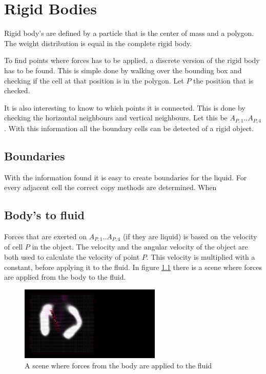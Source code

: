 \chapter{Rigid Bodies}
Rigid body's are defined by a particle that is the center of mass and a polygon. The weight distribution is equal in the complete rigid body.

To find points where forces has to be applied, a discrete version of the rigid body has to be found. This is simple done by walking over the bounding box and checking if the cell at that position is in the polygon. Let $P$ the position that is checked.

It is also interesting to know to which points it is connected. This is done by checking the horizontal neighbours and vertical neighbours. Let this be $A_{P,1} .. A_{P,4}$. With this information all the boundary cells can be detected of a rigid object.

\section{Boundaries}
With the information found it is easy to create boundaries for the liquid. For every adjacent cell the correct copy methods are determined. When

\section{Body's to fluid}
Forces that are exerted on $A_{P,1} .. A_{P,4}$ (if they are liquid) is based on the velocity of cell $P$ in the object. The velocity  and the angular velocity of the object are both used to calculate the velocity of point $P$. This velocity is multiplied with a constant, before applying it to the fluid. In figure \ref{fig:BodyToFluid} there is a scene where forces are applied from the body to the fluid.

\begin{figure}[htb!]
    \centering
    \includegraphics[width=0.6\textwidth]{images/BodyToFluid}
    \caption{A scene where forces from the body are applied to the fluid}
    \label{fig:BodyToFluid}
\end{figure}

